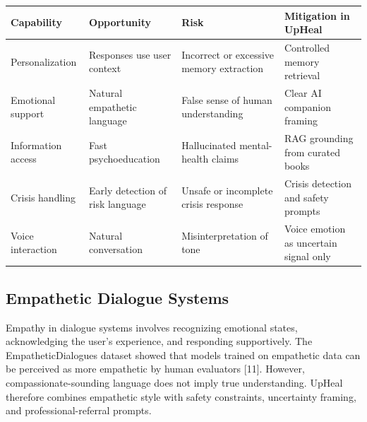 \documentclass[
  letterpaper,
  12pt,
  a4paper,
  openany]{report}
\newcounter{none} %
\begin{document}
{\def\LTcaptype{none} %
\begin{longtable}[]{@{}
  >{\raggedright\arraybackslash}p{}
  >{\raggedright\arraybackslash}p{}
  >{\raggedright\arraybackslash}p{}
  >{\raggedright\arraybackslash}p{}@{}}
\toprule\noalign{}
\begin{minipage}[b]{\linewidth}\raggedright
Capability
\end{minipage} & \begin{minipage}[b]{\linewidth}\raggedright
Opportunity
\end{minipage} & \begin{minipage}[b]{\linewidth}\raggedright
Risk
\end{minipage} & \begin{minipage}[b]{\linewidth}\raggedright
Mitigation in UpHeal
\end{minipage} \\
\midrule\noalign{}
\endhead
\bottomrule\noalign{}
\endlastfoot
Personalization & Responses use user context & Incorrect or excessive
memory extraction & Controlled memory retrieval \\
Emotional support & Natural empathetic language & False sense of human
understanding & Clear AI companion framing \\
Information access & Fast psychoeducation & Hallucinated mental-health
claims & RAG grounding from curated books \\
Crisis handling & Early detection of risk language & Unsafe or
incomplete crisis response & Crisis detection and safety prompts \\
Voice interaction & Natural conversation & Misinterpretation of tone &
Voice emotion as uncertain signal only \\
\end{longtable}
}

\subsection{Empathetic Dialogue
Systems}\label{empathetic-dialogue-systems}

Empathy in dialogue systems involves recognizing emotional states,
acknowledging the user's experience, and responding supportively. The
EmpatheticDialogues dataset showed that models trained on empathetic
data can be perceived as more empathetic by human evaluators {[}11{]}.
However, compassionate-sounding language does not imply true
understanding. UpHeal therefore combines empathetic style with safety
constraints, uncertainty framing, and professional-referral prompts.
\end{document}
